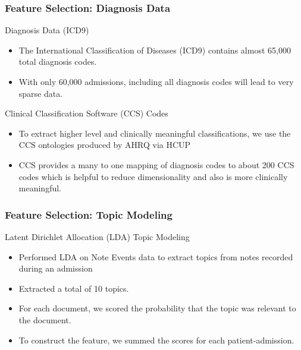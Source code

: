 \documentclass{beamer}
\begin{document}
\begin{frame}
\label{Feature Selection: CCS}
\frametitle{Feature Selection: Diagnosis Data}

Diagnosis Data (ICD9)
\begin{itemize}
\item The International Classification of Diseases (ICD9) contains almost 65,000 total diagnosis codes.
\item With only 60,000 admissions, including all diagnosis codes will lead to very sparse data.
\end{itemize}

Clinical Classification Software (CCS) Codes

\begin{itemize}
\item To extract higher level and clinically meaningful classifications, we use the CCS ontologies produced by AHRQ via HCUP
\item CCS provides a many to one mapping of diagnosis codes to about 200 CCS codes which is helpful to reduce dimensionality and also is more clinically meaningful.
\end{itemize}
\end{frame}

\begin{frame}
\label{Feature Selection: Topic Modeling}
\frametitle{Feature Selection: Topic Modeling}

Latent Dirichlet Allocation (LDA) Topic Modeling

\begin{itemize}
\item Performed LDA on Note Events data to extract topics from notes recorded during an admission
\item Extracted a total of 10 topics.
\item For each document, we scored the probability that the topic was relevant to the document.
\item To construct the feature, we summed the scores for each patient-admission.
\end{itemize}
\end{frame}
\end{document}
